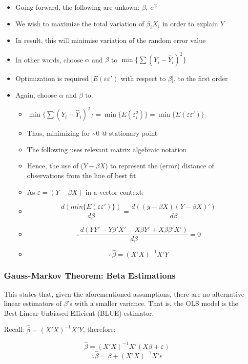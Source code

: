 \documentclass[11pt, english]{article}
\begin{document}
	\begin{itemize}
	\setlength\itemsep{0cm}
		\item Going forward, the following are unkown: $\beta,\ \sigma^2$
		\item We wish to maximize the total variation of $\beta_iX_i$ in order to explain $Y$
		\item In result, this will minimise variation of the random error value
		\item In other words, choose $\alpha$ and $\beta$ to $\min\{\sum(Y_i-\hat{Y}_i)^2\}$
		\item Optimization is required [$E(\varepsilon\varepsilon')$ with respect to $\beta$], to the first order
		\item Again, choose $\alpha$ and $\beta$ to:
		\begin{itemize}
			\item $\min\{\sum(Y_i-\hat{Y}_i)^2\}=\min\{E(\varepsilon_i^2)\}=\min\{E(\varepsilon\varepsilon')\}$
			\item Thus, minimizing for \~{}0 @ stationary point
			\item The following uses relevant matrix algebraic notation
			\item Hence, the use of ($Y-\beta X$) to represent the (error) distance of observations from the line of best fit
			\item As $\varepsilon=(Y-\beta X)$ in a vector context:
			\item $$\frac{d(min\{E(\varepsilon\varepsilon')\})}{d\beta}=\frac{d((y-\beta X)(Y-\beta X)')}{d\beta}$$
			\item $$\therefore\frac{d(YY'-Y\beta'X'-X\beta Y'+X\beta\beta'X')}{d\beta}=0$$
			\item $$\therefore\hat{\beta}=(X'X)^{-1}X'Y$$
		\end{itemize}
	\end{itemize}

		\subsubsection{Gauss-Markov Theorem: Beta Estimations}

	This states that, given the aforementioned assumptions, there are no alternative linear estimators of $\beta$'s with a smaller variance. That is, the OLS model is the Best Linear Unbiased Efficient (BLUE) estimator.

	Recall: $\hat{\beta}=(X'X)^{-1}X'Y$, therefore:

	$$\hat{\beta}=(X'X)^{-1}X'(X\beta+\varepsilon)$$
	$$\therefore\hat{\beta}=\beta+(X'X)^{-1}X'\varepsilon$$
\end{document}
